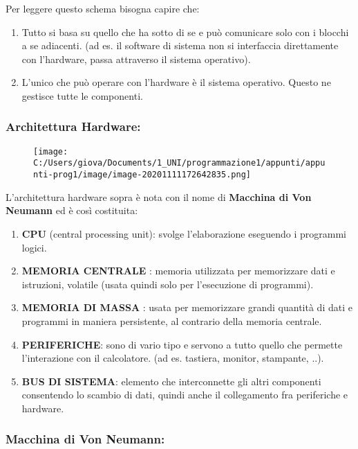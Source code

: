 \documentclass[
]{article}
\begin{document}
Per leggere questo schema bisogna capire che:

\begin{enumerate}
\def\labelenumi{\arabic{enumi}.}
\item
  Tutto si basa su quello che ha sotto di se e può comunicare solo con i
  blocchi a se adiacenti. (ad es. il software di sistema non si
  interfaccia direttamente con l'hardware, passa attraverso il sistema
  operativo).
\item
  L'unico che può operare con l'hardware è il sistema operativo. Questo
  ne gestisce tutte le componenti.
\end{enumerate}

\hypertarget{header-n127}{%
\subsubsection{Architettura Hardware:}\label{header-n127}}

\begin{figure}
\centering
\texttt{[image: C:/Users/giova/Documents/1\_UNI/programmazione1/appunti/appunti-prog1/image/image-20201111172642835.png]}
\caption{}
\end{figure}

L'architettura hardware sopra è nota con il nome di \textbf{Macchina di
Von Neumann} ed è così costituita:

\begin{enumerate}
\def\labelenumi{\arabic{enumi}.}
\item
  \textbf{CPU} (central processing unit): svolge l'elaborazione
  eseguendo i programmi logici.
\item
  \textbf{MEMORIA CENTRALE }: memoria utilizzata per memorizzare dati e
  istruzioni, volatile (usata quindi solo per l'esecuzione di
  programmi).
\item
  \textbf{MEMORIA DI MASSA }: usata per memorizzare grandi quantità di
  dati e programmi in maniera persistente, al contrario della memoria
  centrale.
\item
  \textbf{PERIFERICHE}: sono di vario tipo e servono a tutto quello che
  permette l'interazione con il calcolatore. (ad es. tastiera, monitor,
  stampante, ..).
\item
  \textbf{BUS DI SISTEMA}: elemento che interconnette gli altri
  componenti consentendo lo scambio di dati, quindi anche il
  collegamento fra periferiche e hardware.
\end{enumerate}

\hypertarget{header-n143}{%
\subsubsection{Macchina di Von Neumann:}\label{header-n143}}
\end{document}
